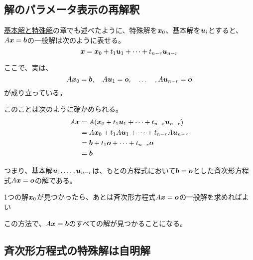 \documentclass[../../../topic_linear-algebra]{subfiles}
\begin{document}
\subsection{解のパラメータ表示の再解釈}

\hyperref[sec:fundamental-and-particular-solutions]{基本解と特殊解}の章でも述べたように、特殊解を$\vb*{x}_0$、基本解を$\vb*{u}_i$とすると、$A\vb*{x} = \vb*{b}$の一般解は次のように表せる。
\begin{equation*}
  \vb*{x} = \vb*{x}_0 + t_1\vb*{u}_1 + \cdots + t_{n-r}\vb*{u}_{n-r}
\end{equation*}

ここで、実は、
\begin{equation*}
  A\vb*{x}_0 = \vb*{b},\quad A\vb*{u}_1 = \vb*{o},\quad \dots \quad , A\vb*{u}_{n-r} = \vb*{o}
\end{equation*}
が成り立っている。

\br

このことは次のように確かめられる。
\begin{align*}
  A\vb*{x} & = A(\vb*{x}_0 + t_1\vb*{u}_1 + \cdots + t_{n-r}\vb*{u}_{n-r}) \\
           & = A\vb*{x}_0 + t_1A\vb*{u}_1 + \cdots + t_{n-r}A\vb*{u}_{n-r} \\
           & = \vb*{b} + t_1\vb*{o} + \cdots + t_{n-r}\vb*{o}              \\
           & = \vb*{b}
\end{align*}

\br

つまり、基本解$\vb*{u}_1,\dots,\vb*{u}_{n-r}$は、もとの方程式において$\vb*{b} = \vb*{o}$とした斉次形方程式$A\vb*{x} = \vb*{o}$の解である。

\begin{emphabox}
  \begin{spacebox}
    \begin{center}
      1つの解$\vb*{x}_0$が見つかったら、あとは斉次形方程式$A\vb*{x} = \vb*{o}$の一般解を求めればよい
    \end{center}
  \end{spacebox}
\end{emphabox}

この方法で、$A\vb*{x} = \vb*{b}$のすべての解が見つかることになる。

\subsection{斉次形方程式の特殊解は自明解}
\end{document}

